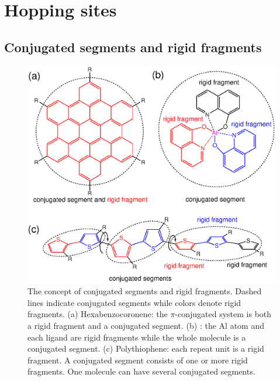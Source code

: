 \chapter{Hopping sites}
\label{sec:mapping}

\newcommand{\ctpmap}{\hyperref[prog:ctp_map]{\texttt{ctp\_map}}\xspace}
\newcommand{\dumptraj}{\hyperref[calc:dumptraj]{\texttt{dumptraj}}\xspace}

\section{Conjugated segments and rigid fragments}
\label{sec:conjugated_segments}

\begin{figure}
\includegraphics[width=\linewidth]{fig/conjugated_segment/fragment_segment}
\caption{\small The concept of conjugated segments and rigid fragments. Dashed lines indicate conjugated segments while colors denote rigid fragments. (a) Hexabenzocoronene: the $\pi$-conjugated system is both a rigid fragment and a conjugated segment. (b) \Alq: the Al atom and each ligand are rigid fragments while the whole molecule is a conjugated segment. (c) Polythiophene: each repeat unit is a rigid fragment. A conjugated segment consists of one or more rigid fragments. One molecule can have several conjugated segments.}
\label{fig:segment}
\end{figure}

